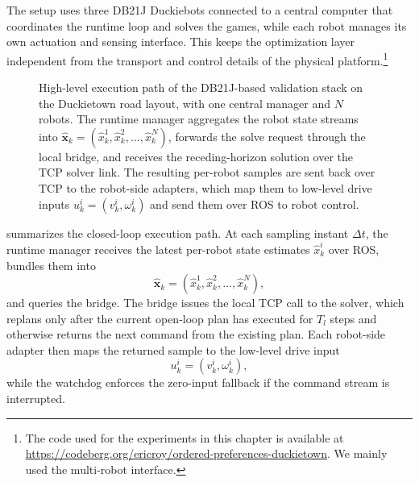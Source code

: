 The setup uses three DB21J Duckiebots connected to a central computer that
coordinates the runtime loop and solves the games, while each robot manages its
own actuation and sensing interface.
This keeps the optimization layer independent from the transport and control
details of the physical platform.\footnote{The code used for the experiments in this chapter is available at \url{https://codeberg.org/ericroy/ordered-preferences-duckietown}. We mainly used the multi-robot interface.}

\begin{figure}[t]
    \centering
    \caption{High-level execution path of the DB21J-based validation stack on the Duckietown road layout,
    with one central manager and $N$ robots. The runtime manager aggregates the robot state streams into
    \(\hat{\mathbf{x}}_k = (\hat{x}_k^1,\hat{x}_k^2,\dots,\hat{x}_k^N)\), forwards the solve
    request through the local bridge, and receives the receding-horizon solution over the TCP solver link.
    The resulting per-robot samples are sent back over TCP to the robot-side adapters, which map them to
    low-level drive inputs \(u_k^i = (v_k^i,\omega_k^i)\) and send them over ROS to robot control.}
    \label{fig:duckietown_architecture}
\end{figure}

 summarizes the closed-loop execution path.
At each sampling instant \(\Delta t\), the runtime manager receives the latest per-robot state estimates
\(\hat{x}_k^i\) over ROS, bundles them into
\[
\hat{\mathbf{x}}_k = (\hat{x}_k^1,\hat{x}_k^2,\dots,\hat{x}_k^N),
\]
and queries the bridge.
The bridge issues the local TCP call to the solver, which replans only after the current open-loop plan has
executed for \(T_l\) steps and otherwise returns the next command from the existing plan.
Each robot-side adapter then maps the returned sample to the low-level drive input
\[
u_k^i = (v_k^i,\omega_k^i),
\]
while the watchdog enforces the zero-input fallback if the command stream is
interrupted.


